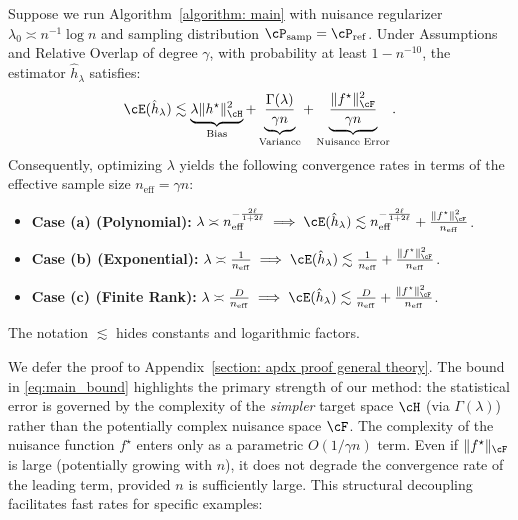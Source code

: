 \documentclass[english,11pt]{article}
\begin{document}
\begin{theorem}\label{theorem; MISE}
    Suppose we run Algorithm~\ref{algorithm: main} with nuisance regularizer $\lambda_0 \asymp n^{-1}\log n$ and sampling distribution $\cP_{\operatorname{samp}} = \cP_{\operatorname{ref}}$.
    Under Assumptions~ and Relative Overlap of degree $\gamma$, with probability at least $1 - n^{-10}$, the estimator $\hat{h}_\lambda$ satisfies:
    \begin{align}\label{eq:main_bound}
        \cE(\hat{h}_\lambda) \lesssim \underbrace{\lambda \|h^\star\|_\cH^2}_{\text{Bias}} + \underbrace{\frac{\Gamma(\lambda)}{\gamma n}}_{\text{Variance}} + \underbrace{\frac{\|f^\star\|_\cF^2}{\gamma n}}_{\text{Nuisance Error}}.
    \end{align}
    Consequently, optimizing $\lambda$ yields the following convergence rates in terms of the effective sample size $n_{\operatorname{eff}} = \gamma n$:
    \begin{itemize}
        \item \textbf{Case (a) (Polynomial):} $\lambda \asymp n_{\operatorname{eff}}^{-\frac{2\ell}{1+2\ell}} \implies  \cE(\hat{h}_\lambda) \lesssim n_{\operatorname{eff}}^{-\frac{2\ell}{1+2\ell}} + \frac{\|f^\star\|_\cF^2}{n_{\operatorname{eff}}}$.
        \item \textbf{Case (b) (Exponential):} $\lambda \asymp \frac{1}{n_{\operatorname{eff}}} \implies \cE(\hat{h}_\lambda) \lesssim \frac{1}{n_{\operatorname{eff}}} + \frac{\|f^\star\|_\cF^2}{n_{\operatorname{eff}}}$.
        \item \textbf{Case (c) (Finite Rank):} $\lambda \asymp \frac{D}{n_{\operatorname{eff}}} \implies \cE(\hat{h}_\lambda) \lesssim \frac{D}{n_{\operatorname{eff}}} + \frac{\|f^\star\|_\cF^2}{n_{\operatorname{eff}}}$.
    \end{itemize}
    The notation \(\lesssim\) hides constants and logarithmic factors.
\end{theorem}
We defer the proof to Appendix~\ref{section: apdx proof general theory}.
The bound in \cref{eq:main_bound} highlights the primary strength of our method: the statistical error is governed by the complexity of the \emph{simpler} target space $\cH$ (via $\Gamma(\lambda)$) rather than the potentially complex nuisance space $\cF$. The complexity of the nuisance function $f^\star$ enters only as a parametric $O(1/\gamma n)$ term. Even if $\|f^\star\|_\cF$ is large (potentially growing with $n$), it does not degrade the convergence rate of the leading term, provided $n$ is sufficiently large.
This structural decoupling facilitates fast rates for specific examples:
\end{document}
